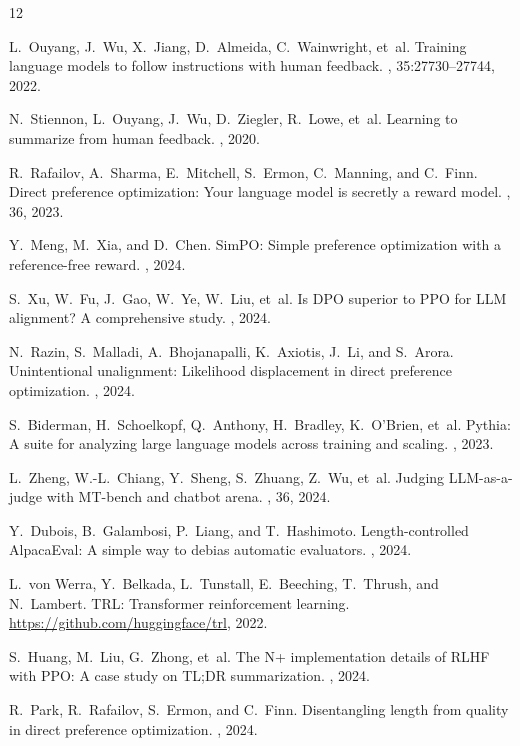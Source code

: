 \documentclass[10pt,twocolumn,letterpaper]{article}
\begin{document}
{\small


\begin{thebibliography}{12}

L.~Ouyang, J.~Wu, X.~Jiang, D.~Almeida, C.~Wainwright, et~al.
\newblock Training language models to follow instructions with human feedback.
, 35:27730--27744, 2022.

N.~Stiennon, L.~Ouyang, J.~Wu, D.~Ziegler, R.~Lowe, et~al.
\newblock Learning to summarize from human feedback.
, 2020.

R.~Rafailov, A.~Sharma, E.~Mitchell, S.~Ermon, C.~Manning, and C.~Finn.
\newblock Direct preference optimization: Your language model is secretly a reward model.
, 36, 2023.

Y.~Meng, M.~Xia, and D.~Chen.
\newblock SimPO: Simple preference optimization with a reference-free reward.
, 2024.

S.~Xu, W.~Fu, J.~Gao, W.~Ye, W.~Liu, et~al.
\newblock Is DPO superior to PPO for LLM alignment? A comprehensive study.
, 2024.

N.~Razin, S.~Malladi, A.~Bhojanapalli, K.~Axiotis, J.~Li, and S.~Arora.
\newblock Unintentional unalignment: Likelihood displacement in direct preference optimization.
, 2024.

S.~Biderman, H.~Schoelkopf, Q.~Anthony, H.~Bradley, K.~O'Brien, et~al.
\newblock Pythia: A suite for analyzing large language models across training and scaling.
, 2023.

L.~Zheng, W.-L.~Chiang, Y.~Sheng, S.~Zhuang, Z.~Wu, et~al.
\newblock Judging LLM-as-a-judge with MT-bench and chatbot arena.
, 36, 2024.

Y.~Dubois, B.~Galambosi, P.~Liang, and T.~Hashimoto.
\newblock Length-controlled AlpacaEval: A simple way to debias automatic evaluators.
, 2024.

L.~von Werra, Y.~Belkada, L.~Tunstall, E.~Beeching, T.~Thrush, and N.~Lambert.
\newblock TRL: Transformer reinforcement learning.
\newblock \url{https://github.com/huggingface/trl}, 2022.

S.~Huang, M.~Liu, G.~Zhong, et~al.
\newblock The N+ implementation details of RLHF with PPO: A case study on TL;DR summarization.
, 2024.

R.~Park, R.~Rafailov, S.~Ermon, and C.~Finn.
\newblock Disentangling length from quality in direct preference optimization.
, 2024.

\end{thebibliography}
}
\end{document}
